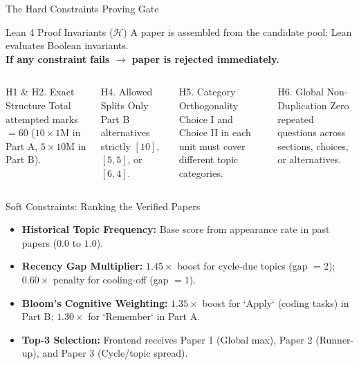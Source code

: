 \documentclass[aspectratio=169]{beamer}
\begin{document}
\begin{frame}{The Hard Constraints Proving Gate}
  \begin{block}{Lean 4 Proof Invariants ($\mathcal{H}$)}
    A paper is assembled from the candidate pool; Lean evaluates Boolean invariants. \\
    \textbf{If any constraint fails $\to$ paper is rejected immediately.}
  \end{block}
  \vspace{0.4em}
  \begin{columns}[T]
    \begin{exampleblock}{H1 \& H2. Exact Structure}
      Total attempted marks $= 60$ ($10\times 1$M in Part A, $5\times 10$M in Part B).
    \end{exampleblock}
    \begin{exampleblock}{H4. Allowed Splits Only}
      Part B alternatives strictly $[10]$, $[5, 5]$, or $[6, 4]$.
    \end{exampleblock}

    \begin{exampleblock}{H5. Category Orthogonality}
      Choice I and Choice II in each unit must cover different topic categories.
    \end{exampleblock}
    \begin{exampleblock}{H6. Global Non-Duplication}
      Zero repeated questions across sections, choices, or alternatives.
    \end{exampleblock}
  \end{columns}
\end{frame}

\begin{frame}{Soft Constraints: Ranking the Verified Papers}
  \vspace{0.6cm}
  \begin{itemize}
    \item \textbf{Historical Topic Frequency:} Base score from appearance rate in past papers ($0.0$ to $1.0$).
    \vspace{0.35cm}
    \item \textbf{Recency Gap Multiplier:} $1.45\times$ boost for cycle-due topics (gap $= 2$); $0.60\times$ penalty for cooling-off (gap $= 1$).
    \vspace{0.35cm}
    \item \textbf{Bloom's Cognitive Weighting:} $1.35\times$ boost for `Apply` (coding tasks) in Part B; $1.30\times$ for `Remember` in Part A.
    \vspace{0.35cm}
    \item \textbf{Top-3 Selection:} Frontend receives Paper 1 (Global max), Paper 2 (Runner-up), and Paper 3 (Cycle/topic spread).
  \end{itemize}
\end{frame}
\end{document}
